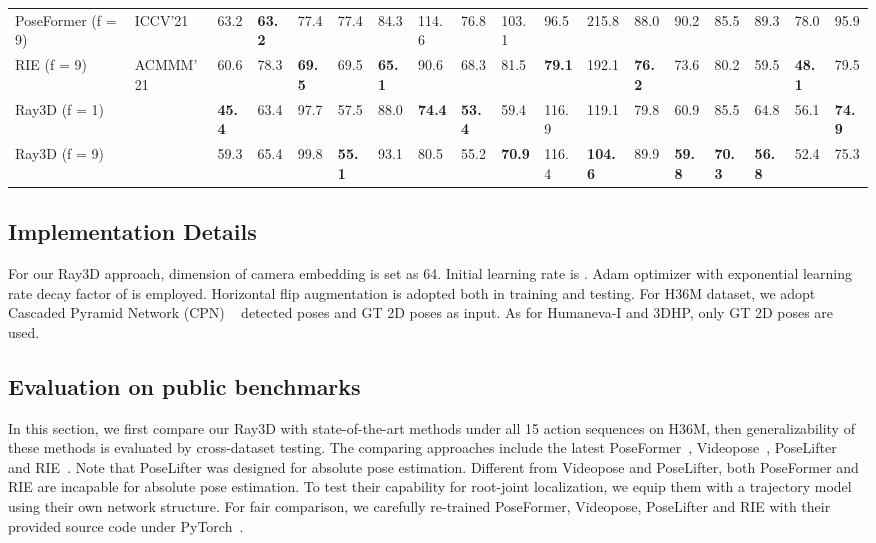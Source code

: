 \documentclass[10pt,twocolumn,letterpaper]{article}
\begin{document}
\begin{table*}[htbp]
\begin{tabular}{@{}l|llllllllllllllll|l@{}}
PoseFormer (f = 9) \cite{ce2021poseformer}       &ICCV'21  &63.2  &\textbf{63.2}  &77.4  &77.4   &84.3  &114.6  & 76.8 & 103.1    & 96.5   & 215.8 & 88.0  & 90.2  & 85.5   & 89.3 & 78.0   & 95.9    \\
RIE (f = 9) ~\cite{wenkang2021improving}         &ACMMM'21 &60.6  &78.3  &\textbf{69.5}  &69.5   &\textbf{65.1}  & 90.6  & 68.3 & 81.5     & \textbf{79.1}   & 192.1 & \textbf{76.2}  & 73.6  & 80.2   & 59.5 & \textbf{48.1}   & 79.5    \\ \hline
Ray3D (f = 1)                                    &         &\textbf{45.4}  &63.4  &97.7  &57.5   &88.0  & \textbf{74.4}  & \textbf{53.4} & 59.4     & 116.9  & 119.1 & 79.8  & 60.9  & 85.5   & 64.8 & 56.1   & \textbf{74.9}    \\ 
Ray3D (f = 9)                                    &         &59.3  &65.4  &99.8  &\textbf{55.1}   &93.1  & 80.5  & 55.2 & \textbf{70.9}     & 116.4  & \textbf{104.6} & 89.9  & \textbf{59.8}  & \textbf{70.3}   & \textbf{56.8} & 52.4   & 75.3    \\ \bottomrule
\end{tabular}
\label{table:3}

\end{table*}
\fi

\subsection{Implementation Details}
\label{subsec: exp_4_2}
For our Ray3D approach, dimension of camera embedding is set as 64. Initial learning rate is . Adam optimizer with exponential learning rate decay factor of  is employed. Horizontal flip augmentation is adopted both in training and testing. For H36M dataset, we adopt Cascaded Pyramid Network (CPN) ~\cite{cpn} detected poses and GT 2D poses as input. As for Humaneva-I and 3DHP, only GT 2D poses are used. 


\subsection{Evaluation on public benchmarks}
\label{subsec: exp_4_3}
In this section, we first compare our Ray3D with state-of-the-art methods under all 15 action sequences on H36M, then generalizability of these methods is evaluated by cross-dataset testing. The comparing approaches include the latest PoseFormer~\cite{ce2021poseformer}, Videopose~\cite{dario2019videopose}, PoseLifter~\cite{ju2019absposelifter} and RIE~\cite{wenkang2021improving}. Note that PoseLifter was designed for absolute pose estimation. Different from Videopose and PoseLifter, both PoseFormer and RIE are incapable for absolute pose estimation. To test their capability for root-joint localization, we equip them with a trajectory model using their own network structure. For fair comparison, we carefully re-trained PoseFormer, Videopose, PoseLifter and RIE with their provided source code under PyTorch~\cite{NEURIPS2019_9015}. 
\end{document}
